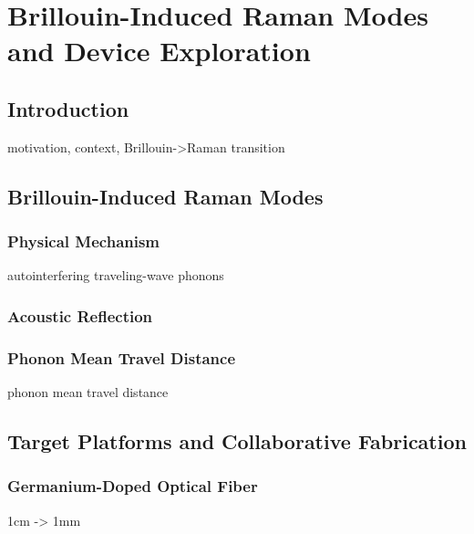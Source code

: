 \setcounter{rownumber}{0}
\singlespacing
\chapter{Brillouin-Induced Raman Modes and Device Exploration}
\label{ch:Raman}
\acresetall

\doublespacing


\section{Introduction}
\label{sec:Raman:Introduction}

motivation, context, Brillouin->Raman transition


\section{Brillouin-Induced Raman Modes}
\label{sec:Raman:Brillouin-Induced}

\subsection{Physical Mechanism}
\label{subsec:Raman:PhysicalMechanism}
  autointerfering traveling-wave phonons

\subsection{Acoustic Reflection}
\label{subsec:Raman:AcousticReflection}

\subsection{Phonon Mean Travel Distance}
\label{subsec:Raman:PhononMeanTravelDistance}
phonon mean travel distance


\section{Target Platforms and Collaborative Fabrication}
\label{sec:Raman:TargetPlatforms}

\subsection{Germanium-Doped Optical Fiber}
\label{subsec:Raman:Target:UHNA3}
1cm -> 1mm

